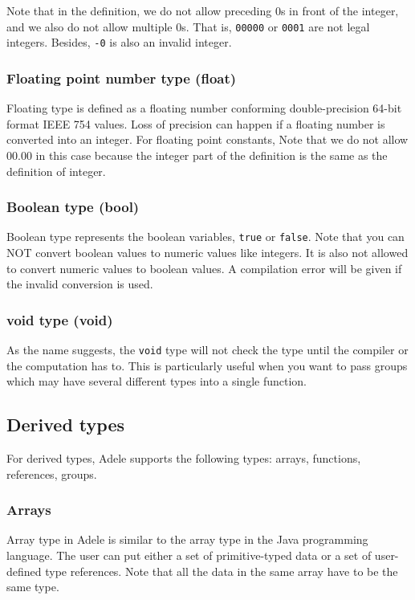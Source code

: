 \documentclass[11pt,letterpaper]{article}
\begin{document}
Note that in the definition, we do not allow preceding 0s in front of the integer, and we also do not allow multiple 0s. That is, \texttt{00000} or \texttt{0001} are not legal integers. Besides, \texttt{-0} is also an invalid integer.

 \subsubsection*{Floating point number type (float)} 
Floating type is defined as a floating number conforming double-precision 64-bit format IEEE 754 values. Loss of precision can happen if a floating number is converted into an integer. For floating point constants, Note that we do not allow 00.00 in this case because the integer part of the definition is the same as the definition of integer.

\subsubsection*{Boolean type (bool)} 
Boolean type represents the boolean variables, \texttt{true} or \texttt{false}. Note that you can NOT convert boolean values to numeric values like integers. It is also not allowed to convert numeric values to boolean values. A compilation error will be given if the invalid conversion is used.

\subsubsection*{void type (void)} 
As the name suggests, the \texttt{void} type will not check the type until the compiler or the computation has to. This is particularly useful when you want to pass groups which may have several different types into a single function.

\subsection{Derived types}
For derived types, Adele supports the following types: arrays, functions, references, groups.

\subsubsection*{Arrays}
Array type in Adele is similar to the array type in the Java programming language. The user can put either a set of primitive-typed data or a set of user-defined type references. Note that all the data in the same array have to be the same type.
\end{document}
